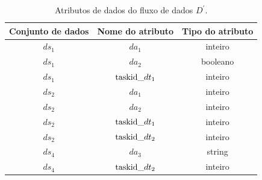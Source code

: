 \begin{table}[htb]
    \centering
    \begin{tabular}{c|c|c}
    \textbf{Conjunto de dados} & \textbf{Nome do atributo} & \textbf{Tipo do atributo} \\ \hline
$ds_1$                        & $da_1$                        & inteiro                 \\
$ds_1$                        & $da_2$                        & booleano                \\
$ds_1$                        & $\textup{taskid\_}dt_1$      & inteiro                 \\ \hline
$ds_2$                        & $da_1$                        & inteiro                 \\
$ds_2$                        & $da_2$                        & inteiro                 \\
$ds_2$                        & $\textup{taskid\_}dt_1$      & inteiro                 \\
$ds_2$                        & $\textup{taskid\_}dt_2$      & inteiro                 \\ \hline
$ds_4$                        & $da_3$                        & string                  \\
$ds_4$                        & $\textup{taskid\_}dt_2$      & inteiro                  
    \end{tabular}
    \caption[Atributos de dados do fluxo de dados \(D^{\prime}\)]{Atributos de dados do fluxo de dados \(D^{\prime}\).}
    \label{tab:example-query-attributes}
\end{table}

